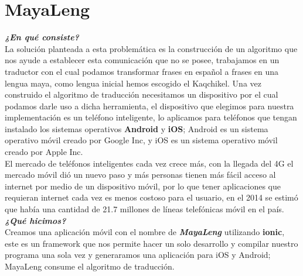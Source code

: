 \documentclass[a4paper,openright,11pt]{article}
\begin{document}
\section{MayaLeng}
\textbf{\textit{¿En qué consiste?}}\\
La solución planteada a esta problemática es la construcción de un algoritmo que nos ayude a establecer esta comunicación que no se posee, trabajamos en un traductor con el cual podamos transformar frases en español a frases en una lengua maya, como lengua inicial hemos escogido el Kaqchikel. Una vez construido el algoritmo de traducción necesitamos un dispositivo por el cual podamos darle uso a dicha herramienta, el dispositivo que elegimos para nuestra implementación es un teléfono inteligente, lo aplicamos para teléfonos que tengan instalado los sistemas operativos \textbf{Android} y \textbf{iOS}; Android es un sistema operativo móvil creado por Google Inc, y iOS es un sistema operativo móvil creado por Apple Inc.\\

El mercado de teléfonos inteligentes cada vez crece más, con la llegada del 4G el mercado móvil dió un nuevo paso y más personas tienen más fácil acceso al internet por medio de un dispositivo móvil, por lo que tener aplicaciones que requieran internet cada vez es menos costoso para el usuario, en el 2014 se estimó que había una cantidad de 21.7 millones de líneas telefónicas móvil en el país.\\

\textbf{\textit{¿Qué hicimos?}}\\
Creamos una aplicación móvil con el nombre de \textbf{\textit{MayaLeng}} utilizando \textbf{ionic}, este es un framework que nos permite hacer un solo desarrollo y compilar nuestro programa una sola vez y generaramos una aplicación para iOS y Android; MayaLeng consume el algoritmo de traducción.\\\\
\end{document}
